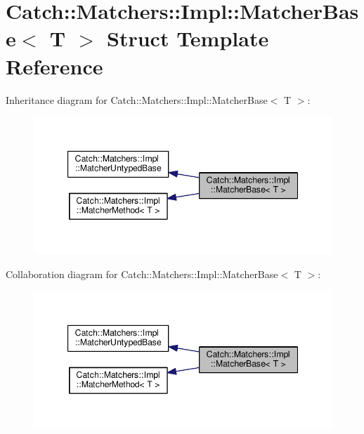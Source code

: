 \hypertarget{structCatch_1_1Matchers_1_1Impl_1_1MatcherBase}{}\section{Catch\+:\+:Matchers\+:\+:Impl\+:\+:Matcher\+Base$<$ T $>$ Struct Template Reference}
\label{structCatch_1_1Matchers_1_1Impl_1_1MatcherBase}


Inheritance diagram for Catch\+:\+:Matchers\+:\+:Impl\+:\+:Matcher\+Base$<$ T $>$\+:\nopagebreak
\begin{figure}[H]
\begin{center}
\leavevmode
\includegraphics[width=347pt]{structCatch_1_1Matchers_1_1Impl_1_1MatcherBase__inherit__graph}
\end{center}
\end{figure}


Collaboration diagram for Catch\+:\+:Matchers\+:\+:Impl\+:\+:Matcher\+Base$<$ T $>$\+:\nopagebreak
\begin{figure}[H]
\begin{center}
\leavevmode
\includegraphics[width=347pt]{structCatch_1_1Matchers_1_1Impl_1_1MatcherBase__coll__graph}
\end{center}
\end{figure}

